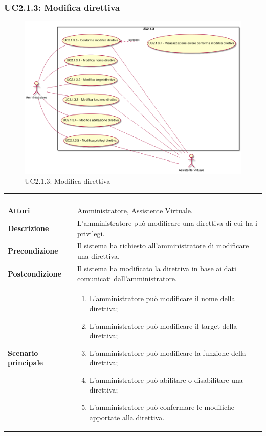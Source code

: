 \newpage\subsubsection{UC2.1.3: Modifica direttiva}
\label{UC2.1.3}
\begin{figure}[h]
	\centering
	\includegraphics[width=\textwidth,height=\textheight,keepaspectratio]{images/UseCaseUC213.png}
	\caption{UC2.1.3: Modifica direttiva}
\end{figure}
\begin{longtable}{l|p{10cm}}
	\rowcolor[gray]{0.8} \multicolumn{2}{c}{} \\
	\rowcolor[gray]{0.8} \multicolumn{2}{c}{\textbf{UC2.1.3 - Modifica direttiva}} \\
	\rowcolor[gray]{0.8} \multicolumn{2}{c}{} \\
	\hline
	&\\
	\textbf{Attori} & Amministratore, Assistente Virtuale.\\[7pt]
	\textbf{Descrizione} & L'amministratore può modificare una direttiva di cui ha i privilegi. \\[7pt]
	\textbf{Precondizione} & Il sistema ha richiesto all'amministratore di modificare una direttiva.\\[7pt]
	\textbf{Postcondizione} & Il sistema ha modificato la direttiva in base ai dati comunicati dall'amministratore.\\[7pt]
	\textbf{Scenario principale} &\begin{enumerate}
		\item  L'amministratore può modificare il nome della direttiva;
		\item  L'amministratore può modificare il target della direttiva;
		\item  L'amministratore può modificare la funzione della direttiva;
		\item  L'amministratore può abilitare o disabilitare una direttiva;
		\item  L'amministratore può confermare le modifiche apportate alla direttiva.
	\end{enumerate}
	\\[7pt]\hline
\end{longtable}

